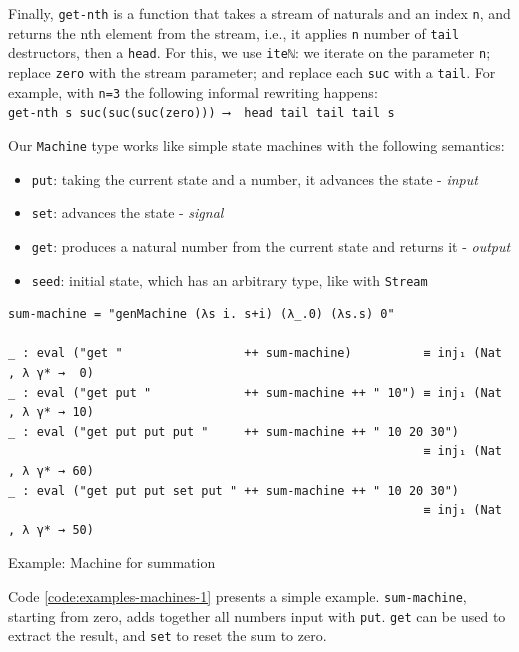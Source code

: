 Finally, \verb$get-nth$ is a function that takes a stream of naturals and an index \verb$n$, and returns the nth element from the stream, i.e., it applies \verb$n$ number of \verb$tail$ destructors, then a \verb$head$. For this, we use \verb$iteℕ$: we iterate on the parameter \verb$n$; replace \verb$zero$ with the stream parameter; and replace each \verb$suc$ with a \verb$tail$. For example, with \verb$n=3$ the following informal rewriting happens:\\
\verb$get-nth s suc(suc(suc(zero))) ⟶  head tail tail tail s$

Our \verb$Machine$ type works like simple state machines with the following semantics:

\begin{itemize}
	\item{\verb$put$: taking the current state and a number, it advances the state - \textit{input}}
	\item{\verb$set$: advances the state - \textit{signal}}
	\item{\verb$get$: produces a natural number from the current state and returns it - \textit{output}}
	\item{\verb$seed$: initial state, which has an arbitrary type, like with \verb$Stream$}
\end{itemize}

\begin{listing}[H]
\begin{verbatim}
sum-machine = "genMachine (λs i. s+i) (λ_.0) (λs.s) 0"

_ : eval ("get "                 ++ sum-machine)          ≡ inj₁ (Nat , λ γ* →  0)
_ : eval ("get put "             ++ sum-machine ++ " 10") ≡ inj₁ (Nat , λ γ* → 10)
_ : eval ("get put put put "     ++ sum-machine ++ " 10 20 30")
                                                          ≡ inj₁ (Nat , λ γ* → 60)
_ : eval ("get put put set put " ++ sum-machine ++ " 10 20 30")
                                                          ≡ inj₁ (Nat , λ γ* → 50)
\end{verbatim}
\caption{Example: Machine for summation}
\label{code:examples-machines-1}
\end{listing}

Code \ref{code:examples-machines-1} presents a simple example. \verb$sum-machine$, starting from zero, adds together all numbers input with \verb$put$. \verb$get$ can be used to extract the result, and \verb$set$ to reset the sum to zero.

